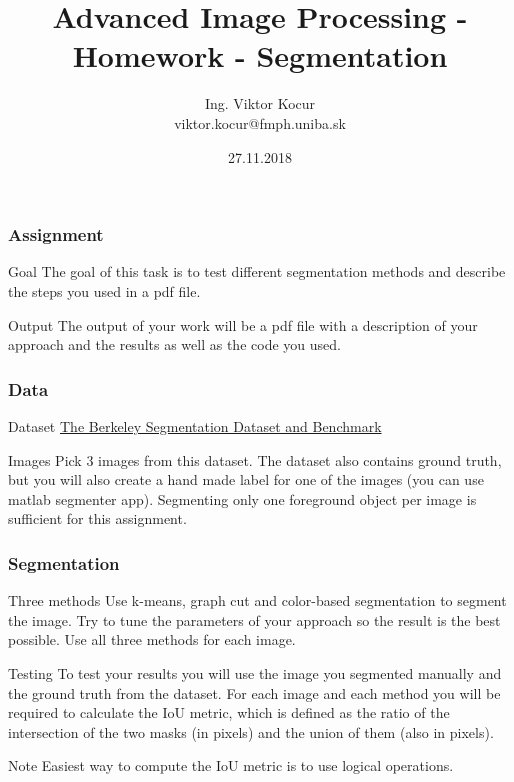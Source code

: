 \documentclass{beamer}
\title[2. Úloha]{Advanced Image Processing - Homework - Segmentation}
\author[Kocur]{Ing. Viktor Kocur \\{\small viktor.kocur@fmph.uniba.sk}}
\institute{DAI FMFI UK}
\date{27.11.2018}
\begin{document}

\begin{frame}
  \titlepage
\end{frame}

\begin{frame}
\frametitle{Assignment}
\begin{block}{Goal}
The goal of this task is to test different segmentation methods and describe the steps you used in a pdf file.
\end{block}

\begin{block}{Output}
The output of your work will be a pdf file with a description of your approach and the results as well as the code you used.
\end{block}
\end{frame}


\begin{frame}
\frametitle{Data}
\begin{block}{Dataset}
\href{https://www2.eecs.berkeley.edu/Research/Projects/CS/vision/bsds/BSDS300/html/dataset/images.html}{The Berkeley Segmentation Dataset and Benchmark}
\end{block}

\begin{block}{Images}
Pick 3 images from this dataset. The dataset also contains ground truth, but you will also create a hand made label for one of the images (you can use matlab segmenter app). Segmenting only one foreground object per image is sufficient for this assignment.

\end{block}
\end{frame}

\begin{frame}
\frametitle{Segmentation}

\begin{block}{Three methods}
Use k-means, graph cut and color-based segmentation to segment the image. Try to tune the parameters of your approach so the result is the best possible. Use all three methods for each image.
\end{block}

\begin{block}{Testing}
To test your results you will use the image you segmented manually and the ground truth from the dataset. For each image and each method you will be required to calculate the IoU metric, which is defined as the ratio of the intersection of the two masks (in pixels) and the union of them (also in pixels).
\end{block}

\begin{alertblock}{Note}
Easiest way to compute the IoU metric is to use logical operations.
\end{alertblock}
\end{frame}
\end{document}

